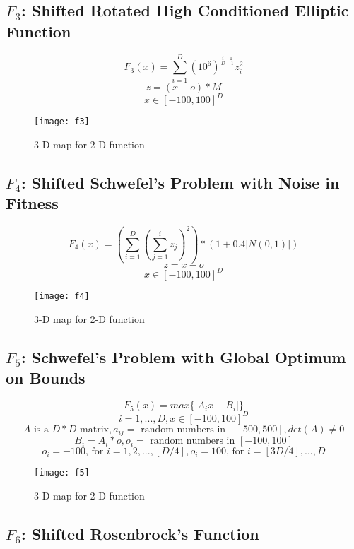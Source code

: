 \subsection{$F_3$: Shifted Rotated High Conditioned Elliptic Function}

\begin{equation}
  F_3(x)=\sum_{i=1}^{D}{(10^6)^{\frac{i-1}{D-1}}z_i^2}
\end{equation}
\[ z=(x-o)*M \]
\[ x \in [-100,100]^D \]

\begin{figure}[H]
  \centering
  \texttt{[image: f3]}
  \caption{3-D map for 2-D function}
  \label{f3}
\end{figure}

\subsection{$F_4$: Shifted Schwefel’s Problem with Noise in Fitness}

\begin{equation}
  F_4(x)=(\sum_{i=1}^{D}{(\sum_{j=1}^{i}{z_j})^2})*(1+0.4|N(0,1)|)
\end{equation}
\[ z=x-o \]
\[ x \in [-100,100]^D \]

\begin{figure}[H]
  \centering
  \texttt{[image: f4]}
  \caption{3-D map for 2-D function}
  \label{f4}
\end{figure}

\subsection{$F_5$: Schwefel’s Problem with Global Optimum on Bounds}

\begin{equation}
  F_5(x)=max\{|A_ix-B_i|\}
\end{equation}
\[ i=1,...,D, x \in [-100,100]^D \]
\[ A \text{ is a } D*D \text{ matrix}, a_{ij} = \text{ random numbers in } [-500,500],  det(A) \neq 0 \]
\[ B_i = A_i * o, o_i = \text{ random numbers in } [-100,100] \]
\[ o_i = -100 \text{, for } i=1,2,...,[D/4], o_i = 100 \text{, for } i=[3D/4],...,D \]

\begin{figure}[H]
  \centering
  \texttt{[image: f5]}
  \caption{3-D map for 2-D function}
  \label{f5}
\end{figure}

\subsection{$F_6$: Shifted Rosenbrock’s Function}

